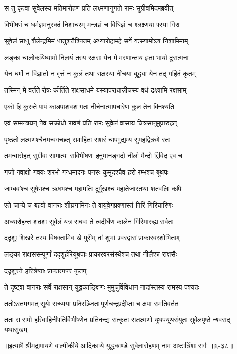 
\twolineshloka
{स तु कृत्वा सुवेलस्य मतिमारोहणं प्रति}
{लक्ष्मणानुगतो रामः सुग्रीवमिदमब्रवीत्} %

\twolineshloka
{विभीषणं च धर्मज्ञमनुरक्तं निशाचरम्}
{मन्त्रज्ञं च विधिज्ञं च श्लक्ष्णया परया गिरा} %

\twolineshloka
{सुवेलं साधु शैलेन्द्रमिमं धातुशतैश्चितम्}
{अध्यारोहामहे सर्वे वत्स्यामोऽत्र निशामिमाम्} %

\twolineshloka
{लङ्कां चालोकयिष्यामो निलयं तस्य रक्षसः}
{येन मे मरणान्ताय हृता भार्या दुरात्मना} %

\twolineshloka
{येन धर्मो न विज्ञातो न वृत्तं न कुलं तथा}
{राक्षस्या नीचया बुद्ध्या येन तद् गर्हितं कृतम्} %

\twolineshloka
{तस्मिन् मे वर्तते रोषः कीर्तिते राक्षसाधमे}
{यस्यापराधान्नीचस्य वधं द्रक्ष्यामि रक्षसाम्} %

\twolineshloka
{एको हि कुरुते पापं कालपाशवशं गतः}
{नीचेनात्मापचारेण कुलं तेन विनश्यति} %

\twolineshloka
{एवं सम्मन्त्रयन् नेव सक्रोधो रावणं प्रति}
{रामः सुवेलं वासाय चित्रसानुमुपारुहत्} %

\twolineshloka
{पृष्ठतो लक्ष्मणश्चैनमन्वगच्छत् समाहितः}
{सशरं चापमुद्यम्य सुमहद्विक्रमे रतः} %

\twolineshloka
{तमन्वारोहत् सुग्रीवः सामात्यः सविभीषणः}
{हनुमानङ्गदो नीलो मैन्दो द्विविद एव च} %

\twolineshloka
{गजो गवाक्षो गवयः शरभो गन्धमादनः}
{पनसः कुमुदश्चैव हरो रम्भश्च यूथपः} %

\twolineshloka
{जाम्बवांश्च सुषेणश्च ऋषभश्च महामतिः}
{दुर्मुखश्च महातेजास्तथा शतवलिः कपिः} %

\twolineshloka
{एते चान्ये च बहवो वानराः शीघ्रगामिनः}
{ते वायुवेगप्रवणास्तं गिरिं गिरिचारिणः} %

\twolineshloka
{अध्यारोहन्त शतशः सुवेलं यत्र राघवः}
{ते त्वदीर्घेण कालेन गिरिमारुह्य सर्वतः} %

\twolineshloka
{ददृशुः शिखरे तस्य विषक्तामिव खे पुरीम्}
{तां शुभां प्रवरद्वारां प्राकारवरशोभिताम्} %

\twolineshloka
{लङ्कां राक्षससम्पूर्णां ददृशुर्हरियूथपाः}
{प्राकारवरसंस्थैश्च तथा नीलैश्च राक्षसैः} %

\onelineshloka
{ददृशुस्ते हरिश्रेष्ठाः प्राकारमपरं कृतम्} %

\twolineshloka
{ते दृष्ट्वा वानराः सर्वे राक्षसान् युद्धकाङ्क्षिणः}
{मुमुचुर्विविधान् नादांस्तस्य रामस्य पश्यतः} %

\twolineshloka
{ततोऽस्तमगमत् सूर्यः सन्ध्यया प्रतिरञ्जितः}
{पूर्णचन्द्रप्रदीप्ता च क्षपा समतिवर्तत} %

\twolineshloka
{ततः स रामो हरिवाहिनीपतिर्विभीषणेन प्रतिनन्द्य सत्कृतः}
{सलक्ष्मणो यूथपयूथसंयुतः सुवेलपृष्ठे न्यवसद् यथासुखम्} %


॥इत्यार्षे श्रीमद्रामायणे वाल्मीकीये आदिकाव्ये युद्धकाण्डे सुवेलारोहणम् नाम अष्टात्रिंशः सर्गः ॥६-३८॥
